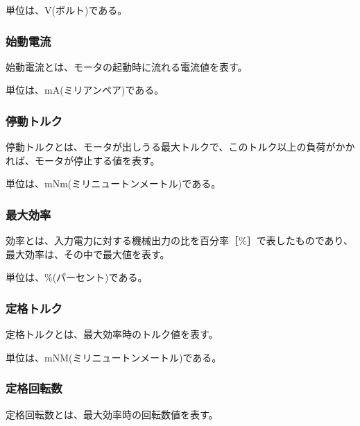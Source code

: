 単位は、V(ボルト)である。
\subsubsection{始動電流}\label{sub:sub:sidouden}
始動電流とは、モータの起動時に流れる電流値を表す。

単位は、mA(ミリアンペア)である。
\subsubsection{停動トルク}\label{sub:sub:teidoutoruku}
停動トルクとは、モータが出しうる最大トルクで、このトルク以上の負荷がかかれば、モータが停止する値を表す。

単位は、mNm(ミリニュートンメートル)である。
\subsubsection{最大効率}\label{sub:sub:saidaikouritu}
効率とは、入力電力に対する機械出力の比を百分率［\%］で表したものであり、最大効率は、その中で最大値を表す。

単位は、\%(パーセント)である。
\subsubsection{定格トルク}\label{sub:sub:teikakutoruku}
定格トルクとは、最大効率時のトルク値を表す。

単位は、mNM(ミリニュートンメートル)である。
\subsubsection{定格回転数}\label{sub:sub:teikakukaiten}
定格回転数とは、最大効率時の回転数値を表す。

